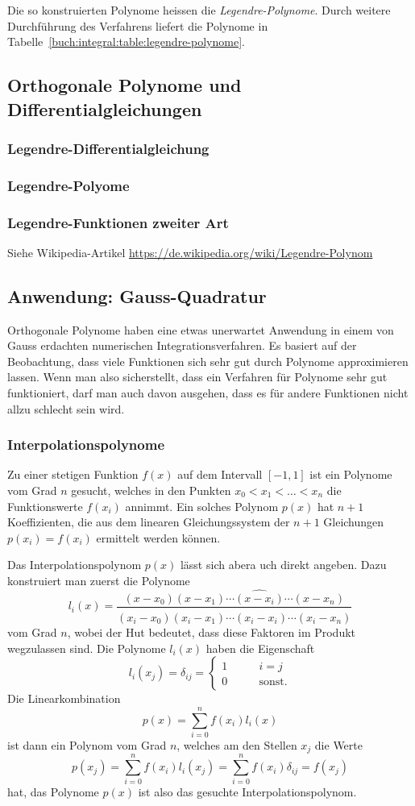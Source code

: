 Die so konstruierten Polynome heissen die {\em Legendre-Polynome}.
Durch weitere Durchführung des Verfahrens liefert die Polynome in
Tabelle~\ref{buch:integral:table:legendre-polynome}.


%
%
\subsection{Orthogonale Polynome und Differentialgleichungen}
\subsubsection{Legendre-Differentialgleichung}
\subsubsection{Legendre-Polyome}
\subsubsection{Legendre-Funktionen zweiter Art}
Siehe Wikipedia-Artikel \url{https://de.wikipedia.org/wiki/Legendre-Polynom}

%
%
\subsection{Anwendung: Gauss-Quadratur}
Orthogonale Polynome haben eine etwas unerwartet Anwendung in einem
von Gauss erdachten numerischen Integrationsverfahren.
Es basiert auf der Beobachtung, dass viele Funktionen sich sehr
gut durch Polynome approximieren lassen.
Wenn man also sicherstellt, dass ein Verfahren für Polynome
sehr gut funktioniert, darf man auch davon ausgehen, dass es für
andere Funktionen nicht allzu schlecht sein wird.

\subsubsection{Interpolationspolynome}
Zu einer stetigen Funktion $f(x)$ auf dem Intervall $[-1,1]$ 
ist ein Polynome vom Grad $n$ gesucht, welches in den Punkten
$x_0<x_1<\dots<x_n$ die Funktionswerte $f(x_i)$ annimmt.
Ein solches Polynom $p(x)$ hat $n+1$ Koeffizienten, die aus dem
linearen Gleichungssystem der $n+1$ Gleichungen $p(x_i)=f(x_i)$ 
ermittelt werden können.

Das Interpolationspolynom $p(x)$ lässt sich abera uch direkt 
angeben.
Dazu konstruiert man zuerst die Polynome
\[
l_i(x)
=
\frac{
(x-x_0)(x-x_1)\cdots\widehat{(x-x_i)}\cdots (x-x_n)
}{
(x_i-x_0)(x_i-x_1)\cdots\widehat{(x_i-x_i)}\cdots (x_i-x_n)
}
\]
vom Grad $n$, wobei der Hut bedeutet, dass diese Faktoren
im Produkt wegzulassen sind.
Die Polynome $l_i(x)$ haben die Eigenschaft
\[
l_i(x_j) = \delta_{ij}
=
\begin{cases}
1&\qquad i=j\\
0&\qquad\text{sonst}.
\end{cases}
\]
Die Linearkombination
\[
p(x) = \sum_{i=0}^n f(x_i)l_i(x)
\]
ist dann ein Polynom vom Grad $n$, welches am den Stellen $x_j$
die Werte
\[
p(x_j) 
=
\sum_{i=0}^n f(x_i)l_i(x_j)
=
\sum_{i=0}^n f(x_i)\delta_{ij}
=
f(x_j)
\]
hat, das Polynome $p(x)$ ist also das gesuchte Interpolationspolynom.

